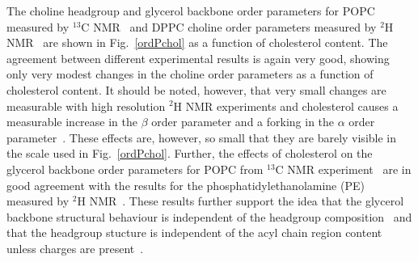 \documentclass[pre,aps,floatfix,authordate1-4,twocolumn]{revtex4-1}
\begin{document}
The choline headgroup and glycerol backbone order parameters for POPC measured by $^{13}$C NMR~\cite{ferreira13} and DPPC choline order parameters 
measured by $^{2}$H NMR~\cite{brown78} are shown in Fig.~\ref{ordPchol} as a function of cholesterol content.
The agreement between different experimental results is again very good, showing only very modest changes in 
the choline order parameters as a function of cholesterol content. It should be noted, however, that very small
changes are measurable with high resolution $^{2}$H NMR experiments
and cholesterol causes a measurable increase in the $\beta$ order parameter and a forking in the $\alpha$ order
parameter~\cite{brown78}. These effects are, however, so small that they are barely visible in the scale used in Fig.~\ref{ordPchol}.
Further, the effects of cholesterol on the glycerol backbone order parameters for POPC from $^{13}$C NMR experiment~\cite{ferreira13} 
are in good agreement with the results for the phosphatidylethanolamine (PE) measured by $^{2}$H NMR~\cite{ghosh82}.
These results further support the idea that the glycerol backbone structural behaviour is independent of the
headgroup composition~\cite{gally81} and that the headgroup stucture is independent of the acyl chain region content unless
charges are present~\cite{scherer87}.
\end{document}
